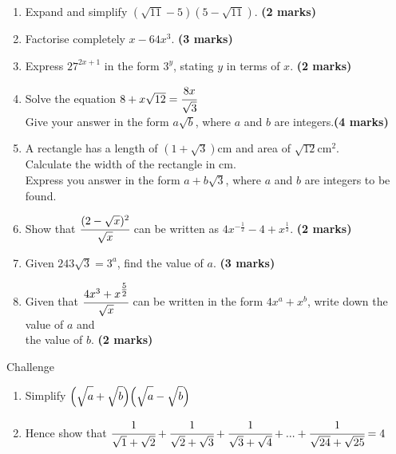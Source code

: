 \documentclass[fleqn, twoside]{article}
\begin{document}
\begin{enumerate}
    \item Expand and simplify $(\sqrt{11}-5)(5-\sqrt{11})$. \hfill\textbf{(2 marks)}
    
    \item Factorise completely $x-64x^3$. \hfill\textbf{(3 marks)}
    
    \item Express $27^{2x+1}$ in the form $3^y$, stating $y$ in terms of $x$. \hfill\textbf{(2 marks)}
    
    \item \vspace{-2mm}Solve the equation $8+x\sqrt{12}=\cfrac{8x}{\sqrt{3}}$\\
        Give your answer in the form $a\sqrt{b}$, where $a$ and $b$ are integers.\hfill\textbf{(4 marks)}
    \item A rectangle has a length of $(1+\sqrt{3})$cm and area of $\sqrt{12}$cm$^2$.\\
          Calculate the width of the rectangle in cm.\\
          Express you answer in the form $a+b\sqrt{3}$, where $a$ and $b$ are integers to be found.
    
    \item Show that $\cfrac{(2-\sqrt{x})^2}{\sqrt{x}}$ can be written as $4x^{-\textstyle\frac{1}{2}}-4+x^{\textstyle\frac{1}{2}}$. \hfill\textbf{(2 marks)}
    
    \item Given $243\sqrt{3}=3^a$, find the value of $a$. \hfill\textbf{(3 marks)}
    
    \item \vspace{-1.5mm}Given that $\cfrac{4x^3+x^{\textstyle\frac{5}{2}}}{\sqrt{x}}$ can be written in the form $4x^a+x^b$, write down the value of $a$ and\\ the value of $b$. \hfill\textbf{(2 marks)}
\end{enumerate}


\begin{mybox2}[colbacktitle=green]{Challenge}
    \rmfamily
    \begin{enumerate}[label=\textbf{\alph*}]
        \item Simplify $\Big(\sqrt{\strut a}+\sqrt{\strut b}\Big)\Big(\sqrt{\strut a}-\sqrt{\strut b}\Big)$
        \item \vspace{-2mm}Hence show that $\cfrac{1}{\sqrt{1}+\sqrt{2}}+\cfrac{1}{\sqrt{2}+\sqrt{3}}+\cfrac{1}{\sqrt{3}+\sqrt{4}}+...+\cfrac{1}{\sqrt{24}+\sqrt{25}}=4$
    \end{enumerate}

\end{mybox2}
\end{document}
